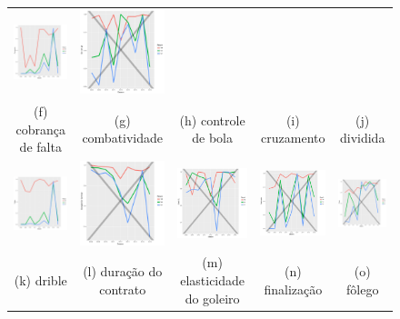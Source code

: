 \documentclass[doc,apacite,oneside,a4paper,12pt]{apa6}
\begin{document}
\begin{figure}
\begin{tabular}{ccccc}
  \includegraphics[width=25mm]{cruzamento_result_trans_media} & \includegraphics[width=25mm]{div_empe_result_trans_media} \\
 \scriptsize{(f) cobrança de falta } & \scriptsize{(g) combatividade } & \scriptsize{(h) controle de bola} & \scriptsize{(i) cruzamento} & \scriptsize{(j) dividida}\\[3pt]
 
 \includegraphics[width=25mm]{dribles_result_trans_media} & \includegraphics[width=25mm]{duracaodocontrato_result_trans_media} &   \includegraphics[width=25mm]{elast_gl_result_trans_media} &
  \includegraphics[width=25mm]{finalizacao_result_trans_media} & \includegraphics[width=25mm]{folego_result_trans_media}  \\
 \scriptsize{(k) drible} & \scriptsize{(l) duração do contrato } & \scriptsize{(m) elasticidade do goleiro} & \scriptsize{(n) finalização} & \scriptsize{(o) fôlego}\\[3pt]
 

\end{tabular}
\end{figure}
\end{document}
